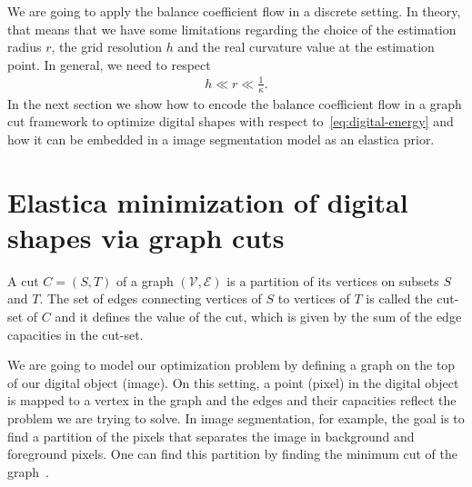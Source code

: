 \documentclass[review]{siamart220329}
\begin{document}
We are going to apply the balance coefficient flow in a discrete setting. In
theory, that means that we have some limitations regarding the choice of the
estimation radius $r$, the grid resolution $h$ and the real curvature value at
the estimation point. In general, we need to respect
%
%
\begin{align*}
	h \ll r \ll \frac{1}{\kappa}.
\end{align*}
%
%
In the next section we show how to encode the balance
coefficient flow in a graph cut framework to optimize digital shapes with
respect to~\cref{eq:digital-energy} and how it can be embedded in a image
segmentation model as an elastica prior. 
%
% 
%
%
%
%
%
%
\section{Elastica minimization of digital shapes via graph cuts}

A cut $C=(S,T)$ of a graph
$(\mathcal{V},\mathcal{E})$ is a partition of its vertices on subsets $S$ and
$T$. The set of edges connecting vertices of $S$ to vertices of $T$ is called
the cut-set of $C$ and it defines the value of the cut, which is given by the
sum of the edge capacities in the cut-set. 

We are going to model our optimization problem by defining a
graph on the top of our digital object (image). On this setting, a point
(pixel) in the digital object is mapped to a vertex in the graph and the edges
and their capacities reflect the problem we are trying to solve. In image
segmentation, for example, the goal is to find a partition of the pixels that
separates the image in background and foreground pixels. One can find this
partition by finding the minimum cut of the graph~\cite{boykov01graphcut}.
\end{document}
